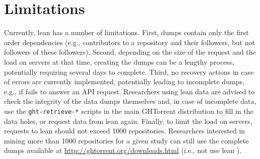 
\section{Limitations}
\label{sec:limitations}

Currently, lean \ght has a number of limitations.
First, dumps contain only the first order dependencies (e.g., contributors to a repository and their followers, but not followers of these
followers).
Second, depending on the size of the request and the load on \ght servers at that time, creating the dumps
can be a lengthy process, potentially requiring several days to complete.
Third, no recovery actions in case of errors are currently implemented, potentially leading to incomplete dumps,
e.g., if \gh fails to answer an API request.
Researchers using lean \ght data are advised to check the integrity of the data dumps themselves and, 
in case of incomplete data, use the \texttt{ght-retrieve-*} scripts in the
main GHTorrent distribution to fill in the data holes, or request data from lean \ght again.
Finally, to limit the load on \ght servers, requests to lean \ght should not exceed 1000 repositories.
Researchers interested in mining more than 1000 repositories for a given study can still use the complete \ght dumps
available at \url{http://ghtorrent.org/downloads.html} (i.e., not use lean \ght).
